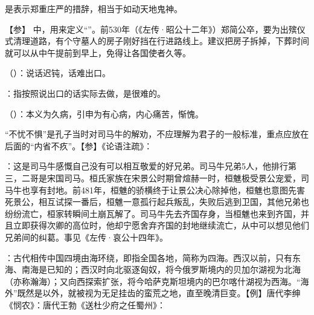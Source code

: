 {
\begin{lyitemize}
\item {}是表示郑重庄严的措辞，相当于如动天地鬼神。
\end{lyitemize}
【参】 中，用来定义“”。前530年（《左传·昭公十二年》）郑简公卒，要为出殡仪式清理道路，有个守墓人的房子刚好挡在行进路线上。建议把房子拆掉，下葬时间就可以从中午提前到早上，免得让各国使者久等。
}
{}


{
\item {}（）：说话迟钝，话难出口。
\item {}：指按照说出口的话实际去做，是很难的。
}
{}


{
\item {}（）：本义为久病，引申为有心病，内心痛苦，惭愧。

“不忧不惧”是孔子当时对司马牛的解劝，不应理解为君子的一般标准，重点应放在后面的“内省不疚”。【参】《论语注疏》： 
}
{}


{
\item {}：这是司马牛感慨自己没有可以相互敬爱的好兄弟。司马牛兄弟5人，他排行第三，二哥是宋国司马。桓氏家族在宋景公时期曾煊赫一时，桓魋极受景公宠爱，司马牛也享有封地。前481年，桓魋的骄横终于让景公决心除掉他，桓魋也意图先害死景公，相互试探一番后，桓魋一意孤行起兵叛乱，失败后逃到卫国，其他兄弟也纷纷流亡，桓家转瞬间土崩瓦解了。司马牛先去齐国存身，当桓魋也来到齐国，并且立即获得次卿的高位时，他却宁愿舍弃齐国的封地继续流亡，从中可以想见他们兄弟间的纠葛。事见《左传·哀公十四年》。

\item {}：古代相传中国四境由海环绕，即指全国各地，简称为四海。西汉以前，只有东海、南海是已知的；西汉时向北驱逐匈奴，将今俄罗斯境内的贝加尔湖视为北海（亦称瀚海）；又向西探索扩张，将今哈萨克斯坦境内的巴尔喀什湖视为西海。“海外”既然是以外，就被视为无足挂齿的蛮荒之地，直至晚清巨变。【例】唐代李绅《悯农》：唐代王勃《送杜少府之任蜀州》：
}
{}


